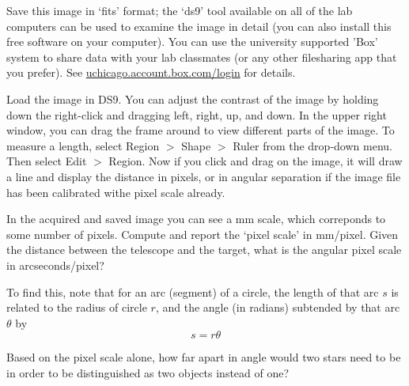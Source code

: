\begin{steps}
	\item Save this image in ‘fits’ format; the ‘ds9’ tool available on all of the lab
	computers can be used to examine the image in detail (you can also install this free software on your computer). You can use the university supported
	’Box’ system to share data with your lab classmates (or any other filesharing app that you prefer). See \url{uchicago.account.box.com/login}
	for details.
	
%	

	\item Load the image in DS9. You can adjust the contrast of the image by holding down the right-click and dragging left, right, up, and down. In the upper right window, you can drag the frame around to view different parts of the image. To measure a length, select Region $>$ Shape $>$ Ruler from the drop-down menu. Then select Edit $>$ Region. Now if you click and drag on the image, it will draw a line and display the distance in pixels, or in angular separation if the image file has been calibrated withe pixel scale already.
	
	\item In the acquired and saved image you can see a mm scale, which correponds to some number
	of pixels. Compute and report the ‘pixel scale’ in mm/pixel. Given the distance between the
	telescope and the target, what is the angular pixel scale in arcseconds/pixel?
	
	To find this, note that for an arc (segment) of a circle, the length of that arc $s$ is related to the radius of circle $r$, and the angle (in radians) subtended by that arc $\theta$ by
	\begin{equation}
	s = r \theta
	\end{equation}

	\item Based on the pixel scale alone, how far apart in angle would two stars need to be in order to be distinguished as two objects instead of one?
	

\end{steps}
